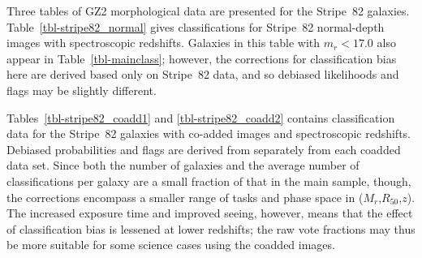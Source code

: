 \documentclass[useAMS,usenatbib]{mn2e}
\newcommand{\mr}{$M_r$}
\newcommand{\rfifty}{$R_{50}$}
\newcommand{\redshift}{$z$}
\begin{document}
%
%
%
%



Three tables of GZ2 morphological data are presented for the Stripe~82 galaxies. Table~\ref{tbl-stripe82_normal} gives classifications for Stripe~82 normal-depth images with spectroscopic redshifts. Galaxies in this table with $m_r < 17.0$ also appear in Table~\ref{tbl-mainclass}; however, the corrections for classification bias here are derived based only on Stripe~82 data, and so debiased likelihoods and flags may be slightly different. 

Tables~\ref{tbl-stripe82_coadd1} and \ref{tbl-stripe82_coadd2} contains classification data for the Stripe~82 galaxies with co-added images and spectroscopic redshifts. Debiased probabilities and flags are derived from separately from each coadded data set. Since both the number of galaxies and the average number of classifications per galaxy are a small fraction of that in the main sample, though, the corrections encompass a smaller range of tasks and phase space in (\mr,\rfifty,\redshift). The increased exposure time and improved seeing, however, means that the effect of classification bias is lessened at lower redshifts; the raw vote fractions may thus be more suitable for some science cases using the coadded images. 
\end{document}
